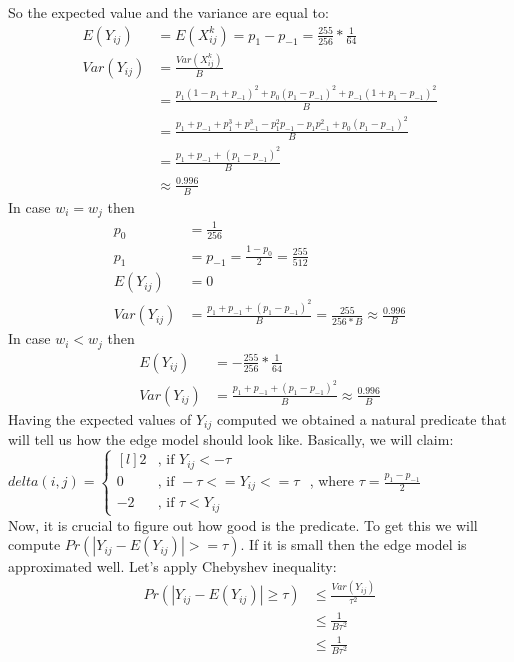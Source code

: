 \documentclass[varwidth]{standalone}
\begin{document}
So the expected value and the variance are equal to:
\begin{align*}
E(Y_{ij}) &= E(X^k_{ij}) = p_1 - p_{-1}=\frac{255}{256}*\frac{1}{64}\\
Var(Y_{ij}) &= \frac{Var(X^k_{ij})}{B}\\
            &= \frac{p_1(1-p_1+p_{-1})^2 + p_0(p_1-p_{-1})^2 + p_{-1}(1+p_1-p_{-1})^2}{B}\\
            &= \frac{p_1 + p_{-1} + p_1^3 + p_{-1}^3 - p_1^2p_{-1} - p_1p_{-1}^2 + p_0(p_1-p_{-1})^2}{B}\\
            &= \frac{p_1 + p_{-1} + (p_1-p_{-1})^2}{B}\\
            &\approx \frac{0.996}{B}
\end{align*}
In case $w_i = w_j$ then\\
\begin{align*}
p_0 &= \frac{1}{256}\\
p_1 &= p_{-1} = \frac{1-p_0}{2} = \frac{255}{512}\\
E(Y_{ij}) &= 0\\
Var(Y_{ij}) &= \frac{p_1 + p_{-1} + (p_1-p_{-1})^2}{B} = \frac{255}{256*B} \approx \frac{0.996}{B}
\end{align*}
In case $w_i < w_j$ then\\
\begin{align*}
E(Y_{ij}) &= -\frac{255}{256}*\frac{1}{64}\\
Var(Y_{ij}) &= \frac{p_1 + p_{-1} + (p_1-p_{-1})^2}{B} \approx \frac{0.996}{B}
\end{align*}
Having the expected values of $Y_{ij}$ computed we obtained a natural predicate
that will tell us how the edge model should look like. Basically, we will
claim:\\
$delta(i, j) = \left\{
  \begin{matrix*}[l]
    2&\text{, if } Y_{ij} < -\tau\\
    0&\text{, if } -\tau <= Y_{ij} <= \tau\\
    -2&\text{, if } \tau < Y_{ij}
  \end{matrix*}\right.$ , where $\tau = \frac{p_1 - p_{-1}}{2}$\\
Now, it is crucial to figure out how good is the predicate. To get this we will
compute $Pr(|Y_{ij} - E(Y_{ij})| >= \tau)$. If it is small then the edge model
is approximated well. Let's apply Chebyshev inequality:
\begin{align*}
Pr(|Y_{ij} - E(Y_{ij})| \geq \tau) &\leq \frac{Var(Y_{ij})}{\tau^2}\\
  & \leq \frac{1}{B\tau^2}\\
  & \leq \frac{1}{B\tau^2}
\end{align*}
\end{document}
